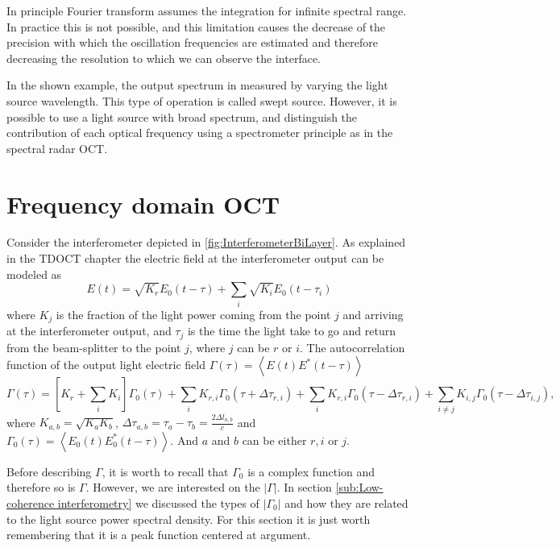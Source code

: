 \documentclass[12pt,twoside,english]{book}
\renewcommand{\~}{\perispomeni}%
\numberwithin{equation}{section}
\numberwithin{figure}{section}
\begin{document}
In principle Fourier transform assumes the integration for infinite spectral range. In practice this is not possible, and this limitation causes the decrease of the precision with which the oscillation frequencies are estimated and therefore decreasing the resolution to which we can observe the interface.

In the shown example, the output spectrum in measured by varying the light source wavelength. This type of operation is called swept source. However, it is possible to use a light source with broad spectrum, and distinguish the contribution of each optical frequency using a spectrometer principle as in the spectral radar OCT.


\section{Frequency domain OCT}

Consider the interferometer depicted in \ref{fig:InterferometerBiLayer}. As explained in the \gls{TDOCT} chapter the electric field at the interferometer output can be modeled as
\begin{equation}
E\left(t\right)=\sqrt{K_{r}}E_{0}\left(t-\tau\right)+\sum_{i}\sqrt{K_{i}}E_{0}\left(t-\tau_{i}\right)\end{equation}
where $K_j$ is the fraction of the light power coming from the point $j$ and arriving at the interferometer output, and $\tau_j$ is the time the light take to go and return from the beam-splitter to the point $j$, where $j$ can be $r$ or $i$. The autocorrelation function of the output light electric field $\Gamma\left(\tau\right)=\left\langle E\left(t\right)E^{*}\left(t-\tau\right)\right\rangle $
\begin{equation}
\Gamma\left(\tau\right)=\left[K_{r}+\sum_{i}K_{i}\right]\Gamma_{0}\left(\tau\right)+\sum_{i}K_{r,i}\Gamma_{0}\left(\tau+\Delta\tau_{r,i}\right)+\sum_{i}K_{r,i}\Gamma_{0}\left(\tau-\Delta\tau_{r,i}\right)+\sum_{i\ne j}K_{i,j}\Gamma_{0}\left(\tau-\Delta\tau_{i,j}\right),\label{eq:FDautocorrelation}\end{equation}
where $K_{a,b}=\sqrt{K_{a}K_{b}}$, $\Delta\tau_{a,b}=\tau_{a}-\tau_{b}=\frac{2\Delta l_{a,b}}{c}$ and $\Gamma_{0}\left(\tau\right)=\left\langle E_{0}\left(t\right)E_{0}^{*}\left(t-\tau\right)\right\rangle $. And $a$ and $b$ can be either $r,i$ or $j$.

Before describing $\Gamma$, it is worth to recall that $\Gamma_{0}$ is a complex function and therefore so is $\Gamma$. However, we are interested on the $\left|\Gamma\right|$. In section \ref{sub:Low-coherence interferometry} we discussed the types of $\left|\Gamma_{0}\right|$ and how they are related to the light source power spectral density. For this section it is just worth remembering that it is a peak function centered at argument.
\end{document}
